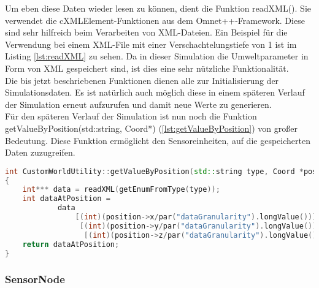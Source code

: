 Um eben diese Daten wieder lesen zu können, dient die Funktion readXML(). Sie verwendet die cXMLElement-Funktionen aus dem Omnet++-Framework. Diese sind sehr hilfreich beim Verarbeiten von XML-Dateien. Ein Beispiel für die Verwendung bei einem XML-File mit einer Verschachtelungstiefe von 1 ist im Listing \ref{lst:readXML} zu sehen. Da in dieser Simulation die Umweltparameter in Form von XML gespeichert sind, ist dies eine sehr nützliche Funktionalität.\\
Die bis jetzt beschriebenen Funktionen dienen alle zur Initialisierung der Simulationsdaten. Es ist natürlich auch möglich diese in einem späteren Verlauf der Simulation erneut aufzurufen und damit neue Werte zu generieren. \\
Für den späteren Verlauf der Simulation ist nun noch die Funktion getValueByPosition(std::string, Coord*) (\ref{lst:getValueByPosition}) von großer Bedeutung. Diese Funktion ermöglicht den Sensoreinheiten, auf die gespeicherten Daten zuzugreifen.

\begin{lstlisting}[language=C++, label=lst:getValueByPosition, caption=getValueByPosition()]
int CustomWorldUtility::getValueByPosition(std::string type, Coord *position)
{
    int*** data = readXML(getEnumFromType(type));
    int dataAtPosition =
            data
                [(int)(position->x/par("dataGranularity").longValue())]
                 [(int)(position->y/par("dataGranularity").longValue())]
                  [(int)(position->z/par("dataGranularity").longValue())];
    return dataAtPosition;
}
\end{lstlisting}

\subsubsection{SensorNode}

